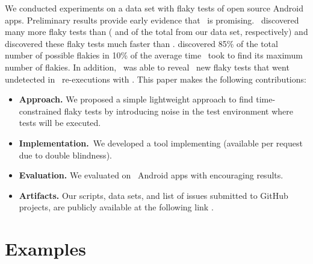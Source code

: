 \documentclass[conference]{IEEEtran}
\begin{document}
We conducted experiments on a data set with \numflakytestsds{} flaky tests of \numprojects{} open source Android apps. Preliminary results provide early evidence that \tname\ is promising. \tname\ discovered many more flaky tests than \rerun{} (\percFlakyDetectedShaker{} and \percFlakyDetectedReRun{} of the total from our data set, respectively) and discovered these flaky tests much faster than \rerun. \tname{} discovered 85\% of the total number of possible flakies in 10\% of the average time \rerun\ took to find its maximum number of flakies. In addition, \tname\ was able to reveal \numTotalNewFlaky\ new flaky tests that went undetected in \numRandomConfigs\ re-executions with \rerun. This paper makes the following contributions:

\begin{itemize}[topsep=.2ex,itemsep=.2ex,leftmargin=0.8em]

\item[\Contrib{}]\textbf{Approach.} We proposed a simple lightweight approach to find time-constrained flaky tests by introducing noise in the test environment where tests will be executed.
  
\item[\Contrib{}]\textbf{Implementation.}~We developed a tool implementing \tname{} (available per request due to double blindness).

  
\item[\Contrib{}]\textbf{Evaluation.} We evaluated \tname{} on \numprojects\ Android apps with encouraging results.

\item[\Contrib{}]\textbf{Artifacts.} Our scripts, data sets, and list of issues submitted to GitHub projects, are publicly available at the following link \textbf{\artifactUrl{}}.

\end{itemize}



\section{Examples}
\label{sec:example}

\end{document}
